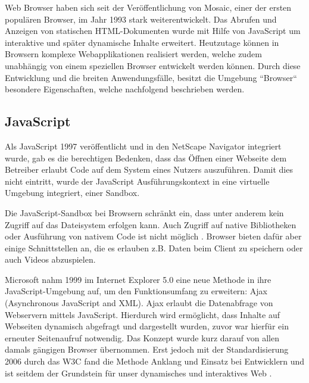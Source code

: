Web Browser haben sich seit der Veröffentlichung von Mosaic, einer der ersten populären Browser, im Jahr 1993 stark weiterentwickelt. Das Abrufen und Anzeigen von statischen HTML-Dokumenten wurde mit Hilfe von JavaScript um interaktive und später dynamische Inhalte erweitert. Heutzutage können in Browsern komplexe Webapplikationen realisiert werden, welche zudem unabhängig von einem speziellen Browser entwickelt werden können. Durch diese Entwicklung und die breiten Anwendungsfälle, besitzt die Umgebung ``Browser`` besondere Eigenschaften, welche nachfolgend beschrieben werden.

\subsection{JavaScript}

Als JavaScript 1997 veröffentlicht und in den NetScape Navigator integriert wurde, gab es die berechtigen Bedenken, dass das Öffnen einer Webseite dem Betreiber erlaubt Code auf dem System eines Nutzers auszuführen. Damit dies nicht eintritt, wurde der JavaScript Ausführungskontext in eine virtuelle Umgebung integriert, einer Sandbox. \cite{LearningJavaScript}

Die JavaScript-Sandbox bei Browsern schränkt ein, dass unter anderem kein Zugriff auf das Dateisystem erfolgen kann. Auch Zugriff auf native Bibliotheken oder Ausführung von nativem Code ist nicht möglich \cite{TheSpyInTheSandbox}. Browser bieten dafür aber einige Schnittstellen an, die es erlauben z.B. Daten beim Client zu speichern oder auch Videos abzuspielen.


Microsoft nahm 1999 im Internet Explorer 5.0 eine neue Methode in ihre JavaScript-Umgebung auf, um den Funktionsumfang zu erweitern: Ajax (Asynchronous JavaScript and XML). Ajax erlaubt die Datenabfrage von Webservern mittels JavaScript. Hierdurch wird ermöglicht, dass Inhalte auf Webseiten dynamisch abgefragt und dargestellt wurden, zuvor war hierfür ein erneuter Seitenaufruf notwendig. Das Konzept wurde kurz darauf von allen damals gängigen Browser übernommen. Erst jedoch mit der Standardisierung 2006 durch das W3C \cite{TheXMLHttpRequestObject} fand die Methode Anklang und Einsatz bei Entwicklern und ist seitdem der Grundstein für unser dynamisches und interaktives Web \cite{TheStoryOfXMLHTTP}.

